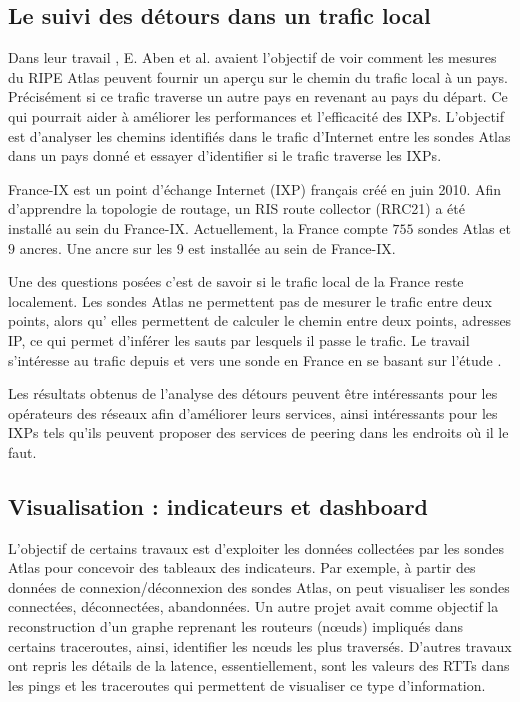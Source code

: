 \subsection{Le suivi des détours dans un trafic local}

Dans leur travail \cite{Emile-Aben-IXP-countries}, E. Aben et al. avaient l'objectif de  voir comment les mesures du RIPE Atlas peuvent fournir un aperçu sur le chemin du trafic local à un pays. Précisément si ce trafic traverse un autre pays en revenant au pays du départ.  Ce qui pourrait  aider à améliorer les performances et l'efficacité des IXPs.  L'objectif est  d'analyser les chemins identifiés dans le trafic d'Internet entre les sondes  Atlas dans un pays donné et essayer d'identifier si le trafic  traverse les IXPs.


France-IX est un point d'échange Internet (IXP) français créé en juin 2010. Afin d'apprendre la topologie de routage, un RIS route collector (RRC21) a été installé au sein du France-IX. Actuellement, la France compte $755$ sondes  Atlas et $9$ ancres. Une ancre sur les $9$ est installée au sein de France-IX.

Une des questions posées c'est de savoir si le trafic local de la France reste localement.  Les sondes  Atlas ne permettent pas de mesurer le trafic entre deux points, alors qu' elles permettent de calculer le chemin entre deux points, adresses IP, ce qui permet d'inférer les sauts par lesquels il passe le trafic. Le travail \cite{France-IX} s'intéresse au trafic depuis et vers une sonde en France en se basant sur l'étude \cite{Emile-Aben-IXP-countries}.


Les résultats obtenus de l'analyse des détours peuvent être intéressants pour les opérateurs des réseaux afin d'améliorer leurs services, ainsi intéressants pour les IXPs tels qu'ils peuvent  proposer des services de peering dans les endroits où il le faut.


\subsection{Visualisation : indicateurs et dashboard}

L'objectif de certains travaux est  d'exploiter les données collectées par les sondes Atlas pour concevoir des tableaux des indicateurs. Par exemple, à partir des données de connexion/déconnexion des sondes Atlas, on peut visualiser les sondes connectées, déconnectées, abandonnées. Un autre projet avait comme objectif la reconstruction d'un graphe reprenant les routeurs (n\oe{}uds) impliqués dans certains traceroutes, ainsi, identifier les n\oe{}uds les plus traversés. D'autres travaux ont repris les détails de la latence, essentiellement, sont les valeurs des RTTs dans les pings et les traceroutes qui permettent de visualiser ce type d'information. 


